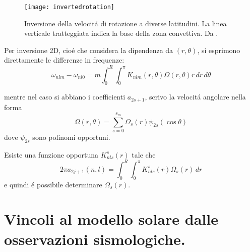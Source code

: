 \documentclass[../main.tex]{subfiles}
\begin{document}
\begin{figure}[!ht]
\centering
\texttt{[image: invertedrotation]}
\caption{Inversione della velocit\'a di rotazione a diverse latitudini. La linea verticale tratteggiata indica la base della zona convettiva. Da \cite{chr02helioseismology}.}
\end{figure}

Per inversione 2D, cio\'e che considera la dipendenza da $(r,\theta)$, si esprimono direttamente le differenze in frequenze:
\begin{equation}
\omega_{nlm}-\omega_{nl0}=m\int_0^R\int_0^{\pi}K_{nlm}(r,\theta)\Omega(r,\theta)r\,dr\,d\theta\label{eq:invrot2D}
\end{equation}

mentre nel caso si abbiano i coefficienti $a_{2s+1}$, scrivo la velocit\'a angolare nella forma
\begin{equation}
\Omega(r,\theta)=\sum_{s=0}^{s_m}\Omega_{s}(r)\psi_{2s}(\cos{\theta})\label{eq:angularv15}
\end{equation}
dove $\psi_{2s}$ sono polinomi opportuni.

Esiste una funzione opportuna $K_{nls}^{s}(r)$ tale che
\begin{equation}
2\pi a_{2j+1}(n,l)=\int_0^R\int_0^{\pi}K_{nls}^{s}(r)\Omega_s(r)\,dr
\end{equation}
e quindi \'e possibile determinare $\Omega_s(r)$.


{\let\clearpage\relax\let\cleardoublepage\relax
\chapter{Vincoli al modello solare dalle osservazioni sismologiche.}%
}
\end{document}
